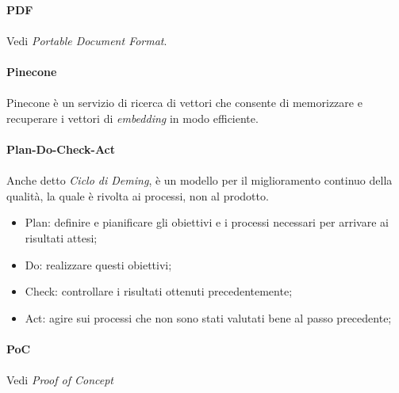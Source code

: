 \documentclass[10pt, a4paper]{article}
\begin{document}
\paragraph{PDF}\noindent\hrulefill 
\paragraph{}Vedi \textit{Portable Document Format\pg}.

\vspace{2em}
\paragraph{Pinecone}\noindent\hrulefill
\paragraph{}Pinecone è un servizio di ricerca di vettori che consente di memorizzare e recuperare i vettori di \textit{embedding} in modo efficiente.


\vspace{2em}
\paragraph{Plan-Do-Check-Act}\noindent\hrulefill
\paragraph{}Anche detto \textit{Ciclo di Deming}, è un modello per il
miglioramento continuo della qualità, la quale è rivolta ai processi, non al prodotto.
\begin{itemize}
    \item Plan: definire e pianificare gli obiettivi e i processi necessari per arrivare ai risultati attesi;
    \item Do: realizzare questi obiettivi;
    \item Check: controllare i risultati ottenuti precedentemente;
    \item Act: agire sui processi che non sono stati valutati bene al passo precedente;
\end{itemize}

\vspace{2em}
\paragraph{PoC}\noindent\hrulefill
\paragraph{} Vedi \textit{Proof of Concept\pg}
\end{document}

